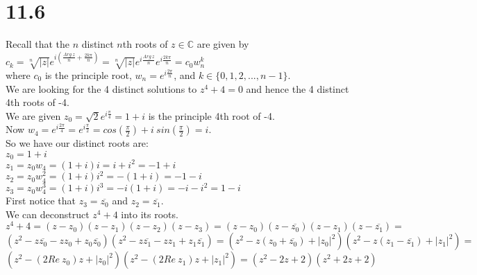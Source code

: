 \documentclass{article}
\begin{document}
\section*{11.6}
\begin{center}
    \doublespacing
    Recall that the $n$ distinct $n$th roots of $z\in\mathbb{C}$ are given by $c_k = \sqrt[n]{|z|} e^{i(\frac{Arg\:z}{n} +\frac{2k\pi}{n})} = \sqrt[n]{|z|} e^{i\frac{Arg\:z}{n}} e^{i\frac{2k\pi}{n}} = c_0 w_n^k$
    \\where $c_0$ is the principle root, $w_n = e^{i\frac{2\pi}{n}}$, and $k\in\{0, 1, 2, ..., n-1\}$.
    \break
    \\We are looking for the 4 distinct solutions to $z^4 + 4 = 0$ and hence the 4 distinct 4th roots of -4.
    \\We are given $z_0 =\sqrt{2} e^{i\frac{\pi}{4}} = 1 + i$ is the principle 4th root of -4.
    \\Now $w_4 = e^{i\frac{2\pi}{4}} = e^{i\frac{\pi}{2}} = cos(\frac{\pi}{2}) + i\:sin(\frac{\pi}{2}) = i$.
    \\So we have our distinct roots are:
    \\$z_0 = 1 + i$
    \\$z_1 = z_0 w_4 = (1 + i)i = i + i^2 = -1 + i$
    \\$z_2 = z_0 w_4^2 = (1 + i)i^2 = -(1 + i) = -1 - i$
    \\$z_3 = z_0 w_4^3 = (1 + i)i^3 = -i(1 + i) = -i - i^2 = 1 - i$
    \break
    \\First notice that $z_3 =\overline{z_0}$ and $z_2 =\overline{z_1}$.
    \\We can deconstruct $z^4 + 4$ into its roots.
    \\$z^4 + 4 = (z - z_0)(z - z_1)(z - z_2)(z - z_3) = (z - z_0)(z -\overline{z_0})(z - z_1)(z -\overline{z_1}) =$
    \\$(z^2 - z\overline{z_0} - z z_0 + z_0\overline{z_0})(z^2 - z\overline{z_1} - z z_1 + z_1\overline{z_1}) = (z^2 - z(z_0 +\overline{z_0}) + |z_0|^2)(z^2 - z(z_1 -\overline{z_1}) + |z_1|^2) =$
    \\$(z^2 - (2 Re\:z_0) z + |z_0|^2)(z^2 - (2 Re\:z_1) z + |z_1|^2) = (z^2 - 2z + 2)(z^2 + 2z + 2)$ \qedsymbol
\end{center}


\newpage
\end{document}

